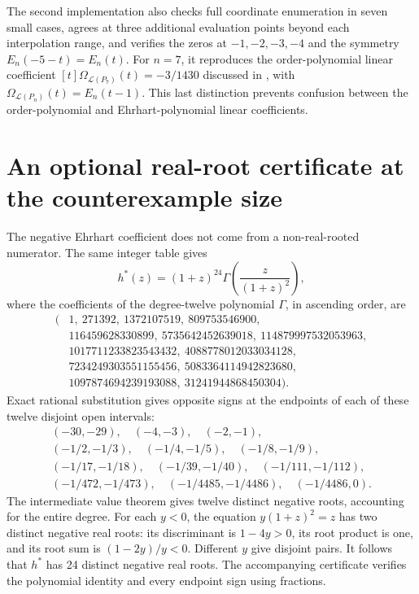 \documentclass[11pt,letterpaper]{article}
\newcommand{\LL}{\mathcal L}
\begin{document}
The second implementation also checks full coordinate enumeration in seven small cases, agrees at three additional evaluation points beyond each interpolation range, and verifies the zeros at $-1,-2,-3,-4$ and the symmetry $E_n(-5-t)=E_n(t)$. For $n=7$, it reproduces the order-polynomial linear coefficient $[t]\Omega_{\LL(P_7)}(t)=-3/1430$ discussed in \cite{LSML}, with $\Omega_{\LL(P_n)}(t)=E_n(t-1)$. This last distinction prevents confusion between the order-polynomial and Ehrhart-polynomial linear coefficients.

\section{An optional real-root certificate at the counterexample size}
The negative Ehrhart coefficient does not come from a non-real-rooted numerator. The same integer table gives
\[
 h^*(z)=(1+z)^{24}\Gamma\!\left(\frac{z}{(1+z)^2}\right),
\]
where the coefficients of the degree-twelve polynomial $\Gamma$, in ascending order, are
\begin{align*}
 (&1,\ 271392,\ 1372107519,\ 809753546900,\\
  &116459628330899,\ 5735642452639018,\ 114879997532053963,\\
  &1017711233823543432,\ 4088778012033034128,\\
  &7234249303551155456,\ 5083364114942823680,\\
  &1097874694239193088,\ 31241944868450304).
\end{align*}
Exact rational substitution gives opposite signs at the endpoints of each of these twelve disjoint open intervals:
\begin{gather*}
(-30,-29),\quad(-4,-3),\quad(-2,-1),\\
(-1/2,-1/3),\quad(-1/4,-1/5),\quad(-1/8,-1/9),\\
(-1/17,-1/18),\quad(-1/39,-1/40),\quad(-1/111,-1/112),\\
(-1/472,-1/473),\quad(-1/4485,-1/4486),\quad(-1/4486,0).
\end{gather*}
The intermediate value theorem gives twelve distinct negative roots, accounting for the entire degree. For each $y<0$, the equation $y(1+z)^2=z$ has two distinct negative real roots: its discriminant is $1-4y>0$, its root product is one, and its root sum is $(1-2y)/y<0$. Different $y$ give disjoint pairs. It follows that $h^*$ has 24 distinct negative real roots. The accompanying certificate verifies the polynomial identity and every endpoint sign using fractions.
\end{document}

